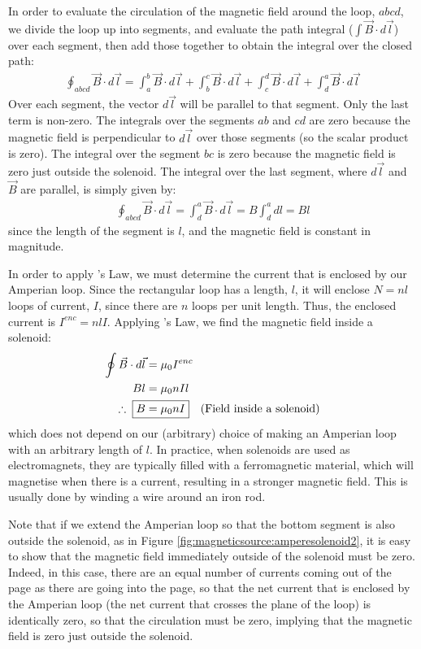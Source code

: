 In order to evaluate the circulation of the magnetic field around the loop, $abcd$, we divide the loop up into segments, and evaluate the path integral ($\int \vec B \cdot d\vec l$) over each segment, then add those together to obtain the integral over the closed path:
\begin{align*}
\oint_{abcd} \vec B \cdot d\vec l = \int_a^b \vec B \cdot d\vec l + \int_b^c \vec B \cdot d\vec l + \int_c^d \vec B \cdot d\vec l + \int_d^a \vec B \cdot d\vec l 
\end{align*}
Over each segment, the vector $d\vec l$ will be parallel to that segment. Only the last term is non-zero. The integrals over the segments $ab$ and $cd$ are zero because the magnetic field is perpendicular to $d\vec l$ over those segments (so the scalar product is zero). The integral over the segment $bc$ is zero because the magnetic field is zero just outside the solenoid. The integral over the last segment, where $d\vec l$ and $\vec B$ are parallel, is simply given by:
\begin{align*}
\oint_{abcd} \vec B \cdot d\vec l = \int_d^a \vec B \cdot d\vec l = B \int_d^a dl = Bl
\end{align*}
since the length of the segment is $l$, and the magnetic field is constant in magnitude.

In order to apply \ampere's Law, we must determine the current that is enclosed by our Amperian loop. Since the rectangular loop has a length, $l$, it will enclose $N=nl$ loops of current, $I$, since there are $n$ loops per unit length. Thus, the enclosed current is $I^{enc}=nlI$. Applying \ampere's Law, we find the magnetic field inside a solenoid:
\begin{align*}
\oint \vec B \cdot d\vec l &=\mu_0 I^{enc}\\
Bl &= \mu_0 nIl\\
\therefore\;\; \Aboxed{B &= \mu_0 nI}\quad \text{(Field inside a solenoid)}
\end{align*}
which does not depend on our (arbitrary) choice of making an Amperian loop with an arbitrary length of $l$. In practice, when solenoids are used as electromagnets, they are typically filled with a ferromagnetic material, which will magnetise when there is a current, resulting in a stronger magnetic field. This is usually done by winding a wire around an iron rod. 

Note that if we extend the Amperian loop so that the bottom segment is also outside the solenoid, as in Figure \ref{fig:magneticsource:amperesolenoid2}, it is easy to show that the magnetic field immediately outside of the solenoid must be zero. Indeed, in this case, there are an equal number of currents coming out of the page as there are going into the page, so that the net current that is enclosed by the Amperian loop (the net current that crosses the plane of the loop) is identically zero, so that the circulation must be zero, implying that the magnetic field is zero just outside the solenoid.

